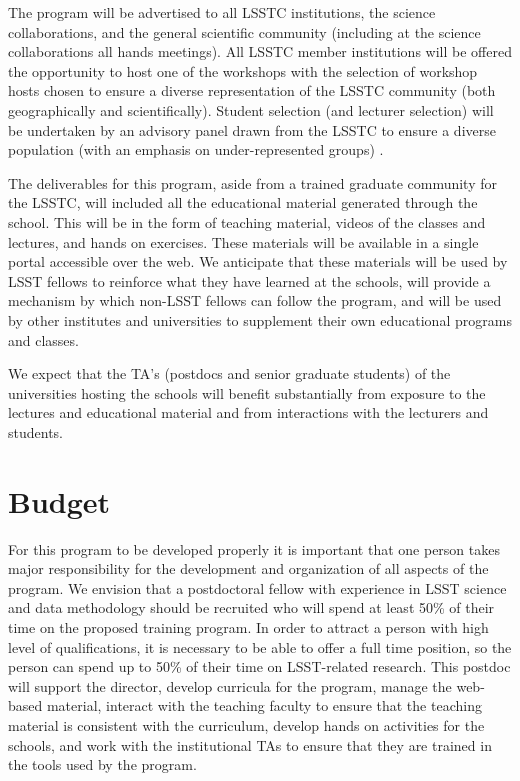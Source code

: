 \documentclass[nofootbib,floatfix,11pt]{article}
\begin{document}
The program will be advertised to all LSSTC institutions, the science collaborations, and the general scientific community (including at the science collaborations all hands meetings). All LSSTC member institutions will be offered the opportunity to host one of the workshops with the selection of workshop hosts chosen to ensure a diverse representation of the LSSTC community (both geographically and scientifically). Student selection (and lecturer selection) will be undertaken by an advisory panel drawn from the LSSTC to ensure a diverse population (with an emphasis on under-represented groups) .

The deliverables for this program, aside from a trained graduate community for the LSSTC, will included all the educational material generated through the school. This will be in the form of teaching material, videos of the classes and lectures, and hands on exercises. These materials will be available in a single portal accessible over the web. We anticipate that these materials will be used by LSST fellows to reinforce what they have learned at the schools, will provide a mechanism by which non-LSST fellows can follow the program, and will be used by other institutes and universities to supplement their own educational programs and classes. 

We expect that the TA's (postdocs and senior graduate students) of the universities hosting the schools will benefit substantially from exposure to the lectures and educational material and from interactions with the lecturers and students.

\section{Budget}

For this program to be developed properly it is important that one person takes major responsibility for the development and organization of all aspects of the program. We envision that a postdoctoral fellow with experience in LSST science and data methodology should be recruited who will spend at least 50\% of their time on the proposed training program. In order to attract a person with high level of qualifications, it is necessary to be able to offer a full time position, so the person can spend up to 50\% of their time on LSST-related research. This postdoc will support the director, develop curricula for the program, manage the web-based material, interact with the teaching faculty to ensure that the teaching material is consistent with the curriculum, develop hands on activities for the schools, and work with the institutional TAs to ensure that they are trained in the tools used by the program.
\end{document}
